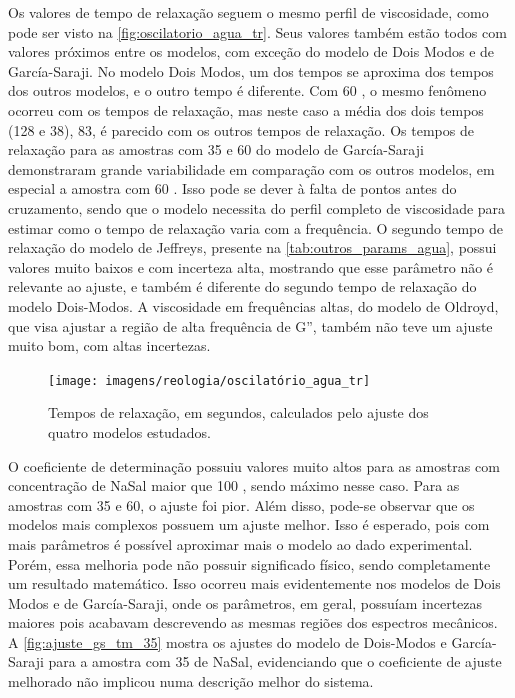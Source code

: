 	Os valores de tempo de relaxação seguem o mesmo perfil de viscosidade, como pode ser visto na \autoref{fig:oscilatorio_agua_tr}. Seus valores também estão todos com valores próximos entre os modelos, com exceção do modelo de Dois Modos e de García-Saraji. No modelo Dois Modos, um dos tempos se aproxima dos tempos dos outros modelos, e o outro tempo é diferente. Com 60 \mM, o mesmo fenômeno ocorreu com os tempos de relaxação, mas neste caso a média dos dois tempos (128 e 38), 83, é parecido com os outros tempos de relaxação. Os tempos de relaxação para as amostras com 35 e 60 \mM{} do modelo de García-Saraji demonstraram grande variabilidade em comparação com os outros modelos, em especial a amostra com 60 \mM. Isso pode se dever à falta de pontos antes do cruzamento, sendo que o modelo necessita do perfil completo de viscosidade para estimar como o tempo de relaxação varia com a frequência. O segundo tempo de relaxação do modelo de Jeffreys, presente na \autoref{tab:outros_params_agua}, possui valores muito baixos e com incerteza alta, mostrando que esse parâmetro não é relevante ao ajuste, e também é diferente do segundo tempo de relaxação do modelo Dois-Modos. A viscosidade em frequências altas, do modelo de Oldroyd, que visa ajustar a região de alta frequência de G'', também não teve um ajuste muito bom, com altas incertezas.
	
	\begin{figure}[h]
		\centering
		\texttt{[image: imagens/reologia/oscilatório\_agua\_tr]}
		\caption{Tempos de relaxação, em segundos, calculados pelo ajuste dos quatro modelos estudados.}
		\label{fig:oscilatorio_agua_tr}  
	\end{figure}
	
	O coeficiente de determinação possuiu valores muito altos para as amostras com concentração de NaSal maior que 100 \mM, sendo máximo nesse caso. Para as amostras com 35 e 60, o ajuste foi pior. Além disso, pode-se observar que os modelos mais complexos possuem um ajuste melhor. Isso é esperado, pois com mais parâmetros é possível aproximar mais o modelo ao dado experimental. Porém, essa melhoria pode não possuir significado físico, sendo completamente um resultado matemático. Isso ocorreu mais evidentemente nos modelos de Dois Modos e de García-Saraji, onde os parâmetros, em geral, possuíam incertezas maiores pois acabavam descrevendo as mesmas regiões dos espectros mecânicos. A \autoref{fig:ajuste_gs_tm_35} mostra os ajustes do modelo de Dois-Modos e García-Saraji para a amostra com 35 \mM{} de NaSal, evidenciando que o coeficiente de ajuste melhorado não implicou numa descrição melhor do sistema.
	
